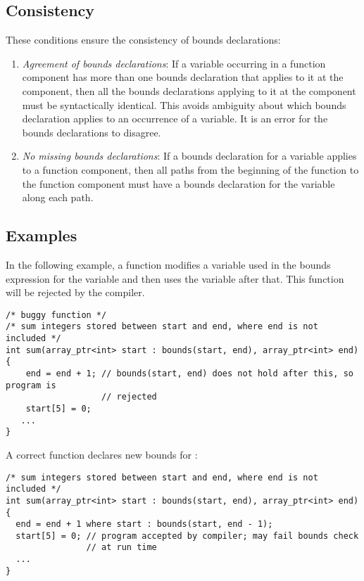  \subsection{Consistency}

These conditions ensure the consistency of bounds declarations:

\begin{enumerate}
\item
  \emph{Agreement of bounds declarations}: If a variable occurring in a
  function component has more than one bounds declaration that applies
  to it at the component, then all the bounds declarations applying to
  it at the component must be syntactically identical. This avoids
  ambiguity about which bounds declaration applies to an occurrence of a
  variable. It is an error for the bounds declarations to disagree.
\item
  \emph{No missing bounds declarations}: If a bounds declaration for a
  variable applies to a function component, then all paths from the
  beginning of the function to the function component must have a bounds
  declaration for the variable along each path.
\end{enumerate}

\subsection{Examples}
\label{examples:consistency}

In the following example, a function modifies a variable 
used in the bounds expression for the variable  and then
uses the variable  after that. This function will be
rejected by the compiler.

\begin{lstlisting}
/* buggy function */
/* sum integers stored between start and end, where end is not included */
int sum(array_ptr<int> start : bounds(start, end), array_ptr<int> end)
{
    end = end + 1; // bounds(start, end) does not hold after this, so program is
                   // rejected
    start[5] = 0;
   ...
}
\end{lstlisting}

A correct function declares new bounds for :

\begin{lstlisting}
/* sum integers stored between start and end, where end is not included */
int sum(array_ptr<int> start : bounds(start, end), array_ptr<int> end)
{
  end = end + 1 where start : bounds(start, end - 1);
  start[5] = 0; // program accepted by compiler; may fail bounds check
                // at run time
  ...
}
\end{lstlisting}


